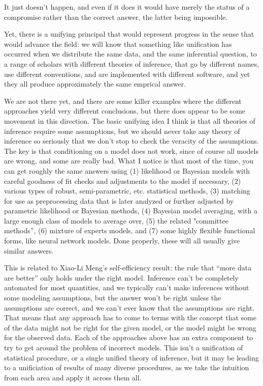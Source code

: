 It just doesn't happen, and even if it does it would have merely the
status of a compromise rather than the correct answer, the latter
being impossible.

Yet, there is a unifying principal that would represent progress in
the sense that would advance the field: we will know that something
like unification has occurred when we distribute the same data, and
the same inferential question, to a range of scholars with different
theories of inference, that go by different names, use different
conventions, and are implemented with different software, and yet they
all produce approximately the same emprical answer.

We are not there yet, and there are some killer examples where the
different approaches yield very different conclusions, but there does
appear to be some movement in this direction. The basic unifying idea
I think is that all theories of inference require some assumptions,
but we should never take any theory of inference so seriously that we
don't stop to check the veracity of the assumptions. The key is that
conditioning on a model does not work, since of course all models are
wrong, and some are really bad. What I notice is that most of the
time, you can get roughly the same answers using (1) likelihood or
Bayesian models with careful goodness of fit checks and adjustments to
the model if necessary, (2) various types of robust, semi-parametric,
etc. statistical methods, (3) matching for use as preprocessing data
that is later analyzed or further adjusted by parametric likelihood or
Bayesian methods, (4) Bayesian model averaging, with a large enough
class of models to average over, (5) the related "committee methods'',
(6) mixture of experts models, and (7) some highly flexible functional
forms, like neural network models. Done properly, these will all
usually give similar answers.

This is related to Xiao-Li Meng's self-efficiency result: the rule
that ``more data are better'' only holds under the right model.
Inference can't be completely automated for most quantities, and we
typically can't make inferences without some modeling assumptions, but
the answer won't be right unless the assumptions are correct, and we
can't ever know that the assumptions are right. That means that any
approach has to come to terms with the concept that some of the data
might not be right for the given model, or the model might be wrong
for the observed data. Each of the approaches above has an extra
component to try to get around the problem of incorrect models. This
isn't a unification of statistical procedure, or a single unified
theory of inference, but it may be leading to a unificiation of
results of many diverse procedures, as we take the intuition from each
area and apply it across them all.

